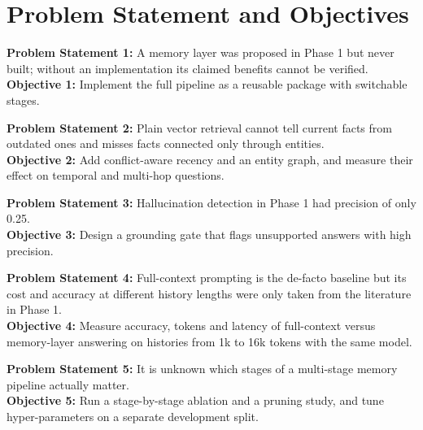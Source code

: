 \section{Problem Statement and Objectives}
\noindent\textbf{Problem Statement 1:} A memory layer was proposed in Phase 1 but never built; without an
implementation its claimed benefits cannot be verified.\\
\textbf{Objective 1:} Implement the full pipeline as a reusable package with switchable stages.

\noindent\textbf{Problem Statement 2:} Plain vector retrieval cannot tell current facts from outdated ones and misses
facts connected only through entities.\\
\textbf{Objective 2:} Add conflict-aware recency and an entity graph, and measure their effect on temporal
and multi-hop questions.

\noindent\textbf{Problem Statement 3:} Hallucination detection in Phase 1 had precision of only 0.25.\\
\textbf{Objective 3:} Design a grounding gate that flags unsupported answers with high precision.

\noindent\textbf{Problem Statement 4:} Full-context prompting is the de-facto baseline but its cost and accuracy at
different history lengths were only taken from the literature in Phase 1.\\
\textbf{Objective 4:} Measure accuracy, tokens and latency of full-context versus memory-layer answering
on histories from 1k to 16k tokens with the same model.

\noindent\textbf{Problem Statement 5:} It is unknown which stages of a multi-stage memory pipeline actually matter.\\
\textbf{Objective 5:} Run a stage-by-stage ablation and a pruning study, and tune hyper-parameters on a
separate development split.
